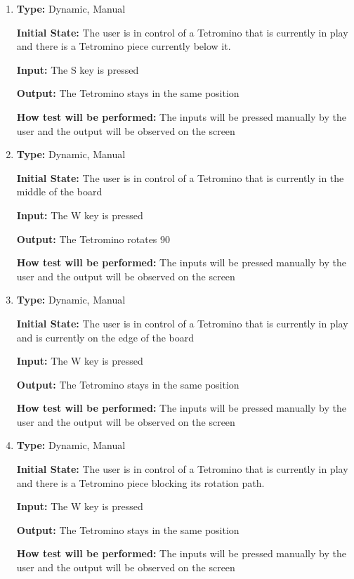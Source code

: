 \documentclass[12pt, titlepage]{article}
\begin{document}
\begin{enumerate}[{FR-CI-}1. ]
		\item
		\textbf{Type:} Dynamic, Manual
		
		\textbf{Initial State:} The user is in control of a Tetromino that is currently in play and there is a Tetromino piece currently below it.
		
		\textbf{Input:} The S key is pressed 
		
		\textbf{Output:} The Tetromino stays in the same position
		
		\textbf{How test will be performed:} The inputs will be pressed manually by the user and the output will be observed on the screen
		
		\item
		\textbf{Type:} Dynamic, Manual
		
		\textbf{Initial State:} The user is in control of a Tetromino that is currently in the middle of the board
		
		\textbf{Input:} The W key is pressed 
		
		\textbf{Output:} The Tetromino rotates 90\degree
		
		\textbf{How test will be performed:} The inputs will be pressed manually by the user and the output will be observed on the screen
		
		\item
		\textbf{Type:} Dynamic, Manual
		
		\textbf{Initial State:} The user is in control of a Tetromino that is currently in play and is currently on the edge of the board
		
		\textbf{Input:} The W key is pressed 
		
		\textbf{Output:} The Tetromino stays in the same position
		
		\textbf{How test will be performed:} The inputs will be pressed manually by the user and the output will be observed on the screen
		
		\item
		\textbf{Type:} Dynamic, Manual
		
		\textbf{Initial State:} The user is in control of a Tetromino that is currently in play and there is a Tetromino piece blocking its rotation path.
		
		\textbf{Input:} The W key is pressed 
		
		\textbf{Output:} The Tetromino stays in the same position
		
		\textbf{How test will be performed:} The inputs will be pressed manually by the user and the output will be observed on the screen
		

\end{enumerate}
\end{document}
